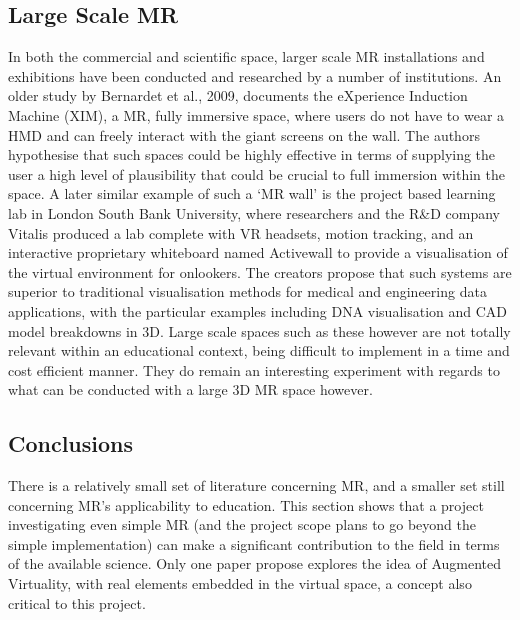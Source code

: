 \documentclass[11pt]{report}
\begin{document}
\subsection{Large Scale MR}
In both the commercial and scientific space, larger scale MR installations and exhibitions have been conducted and researched by a number of institutions. An older study by Bernardet et al., 2009\cite{Bernardet2009}, documents the eXperience Induction Machine (XIM), a MR, fully immersive space, where users do not have to wear a HMD and can freely interact with the giant screens on the wall. The authors hypothesise that such spaces could be highly effective in terms of supplying the user a high level of plausibility that could be crucial to full immersion within the space. A later similar example of such a `MR wall' is the project based learning lab in London South Bank University, where researchers and the R\&D company Vitalis\cite{Virtalis} produced a lab complete with VR headsets, motion tracking, and an interactive proprietary whiteboard named Activewall to provide a visualisation of the virtual environment for onlookers. The creators propose that such systems are superior to traditional visualisation methods for medical and engineering data applications, with the particular examples including DNA visualisation and CAD model breakdowns in 3D. Large scale spaces such as these however are not totally relevant within an educational context, being difficult to implement in a time and cost efficient manner. They do remain an interesting experiment with regards to what can be conducted with a large 3D MR space however.
\subsection{Conclusions}
There is a relatively small set of literature concerning MR, and a smaller set still concerning MR's applicability to education. This section shows that a project investigating even simple MR (and the project scope plans to go beyond the simple implementation) can make a significant contribution to the field in terms of the available science. Only one paper propose explores the idea of Augmented Virtuality, with real elements embedded in the virtual space, a concept also critical to this project.
\end{document}

